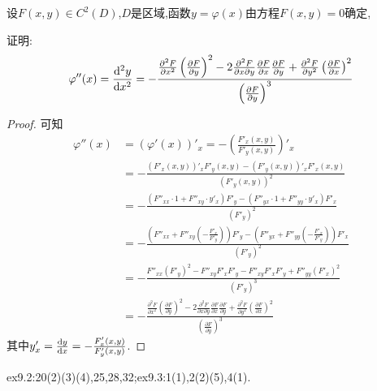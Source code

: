 \begin{example}
    设$F(x,y)\in C^2(D)$,$D$是区域,函数$y=\varphi(x)$由方程$F(x,y)=0$确定,
    
    证明:
    $$\varphi''(x)=\frac{\operatorname{d\!}{}^2y}{\operatorname{d\!}{}x^2}=-\frac{\frac{\partial^2F}{\partial x^2}\left(\frac{\partial F}{\partial y}\right)^2-2\frac{\partial^2F}{\partial x\partial y}\frac{\partial F}{\partial x}\frac{\partial F}{\partial y}+\frac{\partial^2F}{\partial y^2}\left(\frac{\partial F}{\partial x}\right)^2}{\left(\frac{\partial F}{\partial y}\right)^3}$$
\end{example}
\begin{proof}可知
    \begin{align*}
        \varphi''(x)
        &=\left(\varphi'(x)\right)'_x=-\left(\frac{F'_x(x,y)}{F'_y(x,y)}\right)'_x\\
        &=-\frac{\left(F'_x(x,y)\right)'_x F'_y(x,y)-\left(F'_y(x,y)\right)'_x F'_x(x,y)}{\left(F'_y(x,y)\right)^2}\\
        &=-\frac{\left(F''_{xx}\cdot1+F''_{xy}\cdot y'_x\right) F'_y-\left(F''_{yx}\cdot1+F''_{yy}\cdot y'_x\right) F'_x}{\left(F'_y\right)^2}\\
        &=-\frac{\left(F''_{xx}+F''_{xy}\left(-\frac{F'_x}{F'_y}\right)\right) F'_y-\left(F''_{yx}+F''_{yy}\left(-\frac{F'_x}{F'_y}\right)\right) F'_x}{\left(F'_y\right)^2}\\
        &=-\frac{F''_{xx}\left(F'_y\right)^2-F''_{xy}F'_x F'_y-F''_{xy}F'_x F'_y+F''_{yy}\left(F'_x\right)^2}{\left(F'_y\right)^3}\\
        &=-\frac{\frac{\partial^2F}{\partial x^2}\left(\frac{\partial F}{\partial y}\right)^2-2\frac{\partial^2F}{\partial x\partial y}\frac{\partial F}{\partial x}\frac{\partial F}{\partial y}+\frac{\partial^2F}{\partial y^2}\left(\frac{\partial F}{\partial x}\right)^2}{\left(\frac{\partial F}{\partial y}\right)^3}
    \end{align*}
    其中$y'_x=\frac{\operatorname{d\!}{}y}{\operatorname{d\!}{}x}=-\frac{F'_x(x,y)}{F'_y(x,y)}$.
\end{proof}
        
\begin{homework} 
    ex9.2:20(2)(3)(4),25,28,32;ex9.3:1(1),2(2)(5),4(1).
\end{homework}
